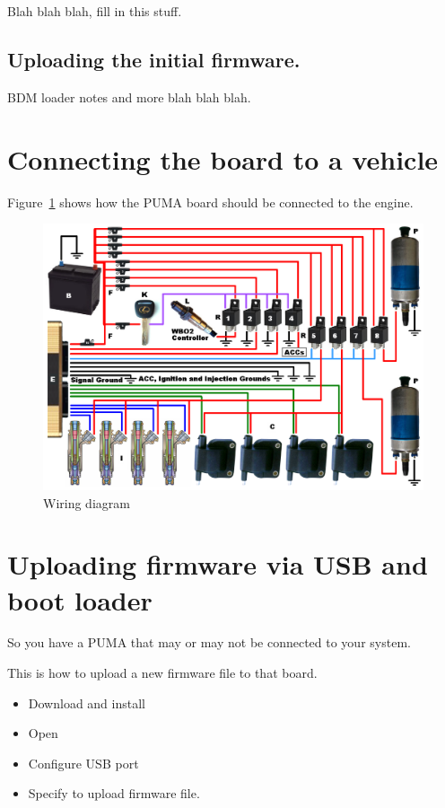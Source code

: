 \documentclass[12pt,a4paper,titlepage]{article}
\begin{document}
Blah blah blah, fill in this stuff.

\subsection{Uploading the initial firmware.}

BDM loader notes and more blah blah blah. 
 

\section{Connecting the board to a vehicle}

Figure~\ref{fig:wiring} shows how the PUMA board should be connected to the engine.

\begin{figure}[htb]
\begin{center}
\includegraphics[width=1\textwidth]{images/freeems-power-wiring5.png}
\caption{Wiring diagram}
\label{fig:wiring}
\end{center}
\end{figure}

\section{Uploading firmware via USB and boot loader}

So you have a PUMA that may or may not be connected to your system.

This is how to upload a new firmware file to that board.

\begin{itemize}
\item Download and install 

\item Open

\item Configure USB port

\item Specify to upload firmware file.
\end{itemize}
\end{document}
